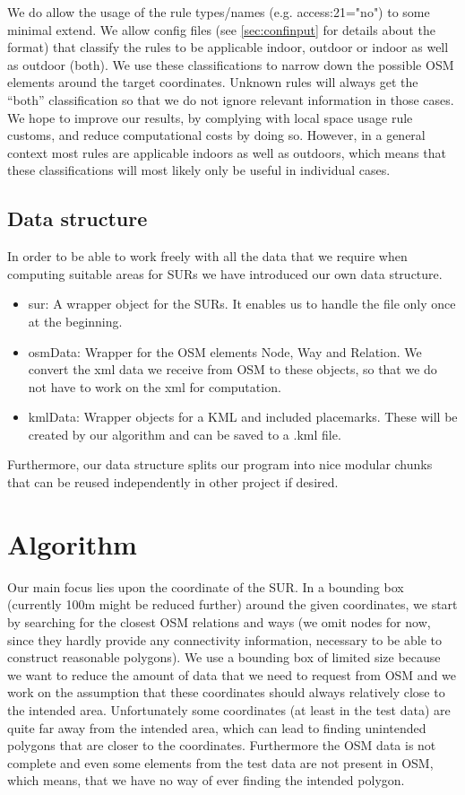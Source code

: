 \documentclass[11pt,fleqn]{book} %
\newcommand{\todol}{\todo[inline]} %
\begin{document}
We do allow the usage of the rule types/names (e.g. access:21="no") to some minimal extend. We allow config files (see \ref{sec:confinput} for details about the format) that classify the rules to be applicable indoor, outdoor or indoor as well as outdoor (both). We use these classifications to narrow down the possible OSM elements around the target coordinates. Unknown rules will always get the ``both'' classification so that we do not ignore relevant information in those cases. We hope to improve our results, by complying with local space usage rule customs, and reduce computational costs by doing so. However, in a general context most rules are applicable indoors as well as outdoors, which means that these classifications will most likely only be useful in individual cases. 

\subsection{Data structure}
In order to be able to work freely with all the data that we require when computing suitable areas for SURs we have introduced our own data structure.
\begin{itemize}
	\item sur: A wrapper object for the SURs. It enables us to handle the file only once at the beginning.
	\item osmData: Wrapper for the OSM elements Node, Way and Relation. We convert the xml data we receive from OSM to these objects, so that we do not have to work on the xml for computation.
	\item kmlData: Wrapper objects for a KML and included placemarks. These will be created by our algorithm and can be saved to a .kml file.
\end{itemize}

Furthermore, our data structure splits our program into nice modular chunks that can be reused independently in other project if desired.

\section{Algorithm}\label{sec:algorithm}
\todol{pseudocode}
\todol{rework this section}

Our main focus lies upon the coordinate of the SUR. In a bounding box (currently 100m might be reduced further) around the given coordinates, we start by searching for the closest OSM relations and ways (we omit nodes for now, since they hardly provide any connectivity information, necessary to be able to construct reasonable polygons). We use a bounding box of limited size because we want to reduce the amount of data that we need to request from OSM and we work on the assumption that these coordinates should always relatively close to the intended area. Unfortunately some coordinates (at least in the test data) are quite far away from the intended area, which can lead to finding unintended polygons that are closer to the coordinates. Furthermore the OSM data is not complete and even some elements from the test data are not present in OSM, which means, that we have no way of ever finding the intended polygon.
\end{document}

